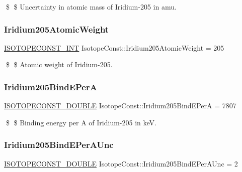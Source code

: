 \$ \$ Uncertainty in atomic mass of Iridium-\/205 in amu. \mbox{\label{group___isotope_const-_iridium-_ir205_ga35e3154afc3b662c048ffa5439234c55}} 
\subsubsection{\texorpdfstring{Iridium205\+Atomic\+Weight}{Iridium205AtomicWeight}}
{\footnotesize\ttfamily \mbox{\hyperlink{group___isotope_const-_macros_ga5f18360b3e99483a35c32d789e62621c}{I\+S\+O\+T\+O\+P\+E\+C\+O\+N\+S\+T\+\_\+\+I\+NT}} Isotope\+Const\+::\+Iridium205\+Atomic\+Weight = 205}

\$ \$ Atomic weight of Iridium-\/205. \mbox{\label{group___isotope_const-_iridium-_ir205_ga17356f870c32d6555fc38e6daef40c6c}} 
\subsubsection{\texorpdfstring{Iridium205\+Bind\+E\+PerA}{Iridium205BindEPerA}}
{\footnotesize\ttfamily \mbox{\hyperlink{group___isotope_const-_macros_ga8f45a7272ce02c0b4c65c44636ed719a}{I\+S\+O\+T\+O\+P\+E\+C\+O\+N\+S\+T\+\_\+\+D\+O\+U\+B\+LE}} Isotope\+Const\+::\+Iridium205\+Bind\+E\+PerA = 7807}

\$ \$ Binding energy per A of Iridium-\/205 in keV. \mbox{\label{group___isotope_const-_iridium-_ir205_ga22e6663dfd4152d49652b6b845b53345}} 
\subsubsection{\texorpdfstring{Iridium205\+Bind\+E\+Per\+A\+Unc}{Iridium205BindEPerAUnc}}
{\footnotesize\ttfamily \mbox{\hyperlink{group___isotope_const-_macros_ga8f45a7272ce02c0b4c65c44636ed719a}{I\+S\+O\+T\+O\+P\+E\+C\+O\+N\+S\+T\+\_\+\+D\+O\+U\+B\+LE}} Isotope\+Const\+::\+Iridium205\+Bind\+E\+Per\+A\+Unc = 2}

